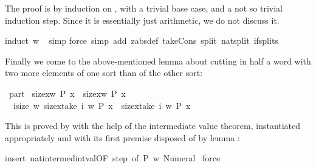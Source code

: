 \begin{isabellebody}
\begin{isamarkuptxt}
The proof is by induction on , with a trivial base case, and a not
so trivial induction step. Since it is essentially just arithmetic, we do not
discuss it.%
\end{isamarkuptxt}%
\isamarkuptrue%
induct\ w{\isacharparenright}\isanewline
\ \isamarkupfalse%
simp{\isacharparenright}\isanewline
\isamarkupfalse%
force\ simp\ add{\isacharcolon}\ zabs{\isacharunderscore}def\ take{\isacharunderscore}Cons\ split{\isacharcolon}\ nat{\isachardot}split\ if{\isacharunderscore}splits{\isacharparenright}\isamarkupfalse%
%
\begin{isamarkuptext}%
Finally we come to the above-mentioned lemma about cutting in half a word with two more elements of one sort than of the other sort:%
\end{isamarkuptext}%
\isamarkuptrue%
\ part{}{\isacharcolon}\isanewline
\ {\isachardoublequote}size{\isacharbrackleft}x{\isasymin}w{\isachardot}\ P\ x{\isacharbrackright}\ {\isacharequal}\ size{\isacharbrackleft}x{\isasymin}w{\isachardot}\ {\isasymnot}P\ x{\isacharbrackright}{\isacharplus}{}\ {\isasymLongrightarrow}\isanewline
\ \ {\isasymexists}i{\isasymle}size\ w{\isachardot}\ size{\isacharbrackleft}x{\isasymin}take\ i\ w{\isachardot}\ P\ x{\isacharbrackright}\ {\isacharequal}\ size{\isacharbrackleft}x{\isasymin}take\ i\ w{\isachardot}\ {\isasymnot}P\ x{\isacharbrackright}{\isacharplus}{}{\isachardoublequote}\isamarkupfalse%
%
\begin{isamarkuptxt}%
\noindent
This is proved by  with the help of the intermediate value theorem,
instantiated appropriately and with its first premise disposed of by lemma
:%
\end{isamarkuptxt}%
\isamarkuptrue%
insert\ nat{}{\isacharunderscore}intermed{\isacharunderscore}int{\isacharunderscore}val{\isacharbrackleft}OF\ step{}{\isacharcomma}\ of\ {\isachardoublequote}P{\isachardoublequote}\ {\isachardoublequote}w{\isachardoublequote}\ {\isachardoublequote}Numeral{}{\isachardoublequote}{\isacharbrackright}{\isacharparenright}\isanewline
\isamarkupfalse%
\ force\isamarkupfalse%
%
\begin{isamarkuptext}%
\noindent


\end{isamarkuptext}
\end{isabellebody}
